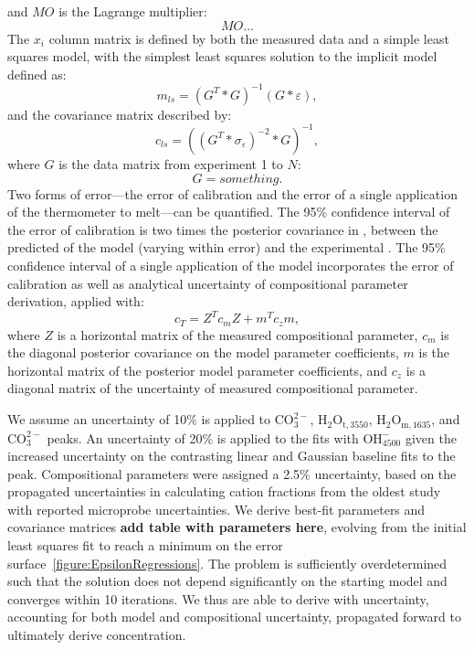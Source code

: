 \documentclass[draft]{agujournal2019}
\begin{document}
and $MO$ is the Lagrange multiplier: 
\begin{equation}
    MO...
\end{equation}
The $x_i$ column matrix is defined by both the measured data and a simple least squares model, with the simplest least squares solution to the implicit model defined as: 
\begin{equation}
    m_{ls} = (G^T*G)^{-1} (G*\varepsilon), 
\end{equation} and the covariance matrix described by: 
\begin{equation}
    c_{ls} = ((G^T*\sigma_{\varepsilon})^{-2} * G)^{-1}, 
\end{equation}
where $G$ is the data matrix from experiment 1 to $N$: 
\begin{equation}
    G = something. 
\end{equation}
Two forms of error—the error of calibration and the error of a single application of the thermometer to melt—can be quantified. The 95\% confidence interval of the error of calibration is two times the posterior covariance in \textepsilon, between the predicted \textepsilon of the model (varying within error) and the experimental \textepsilon. The 95\% confidence interval of a single application of the model incorporates the error of calibration as well as analytical uncertainty of compositional parameter derivation, applied with: 
\begin{equation}
    c_T = Z^T c_m Z + m^T c_z m, 
\end{equation}
where $Z$ is a horizontal matrix of the measured compositional parameter, $c_m$ is the diagonal posterior covariance on the model parameter coefficients, $m$ is the horizontal matrix of the posterior model parameter coefficients, and $c_z$ is a diagonal matrix of the uncertainty of measured compositional parameter. 

We assume an uncertainty of 10\% is applied to \textepsilon${\mathrm{CO_3^{2-}}}$, \textepsilon${\mathrm{H_2O_{t, 3550}}}$, \textepsilon${\mathrm{H_2O_{m, 1635}}}$, and \textepsilon${\mathrm{CO_3^{2-}}}$ peaks. An uncertainty of 20\% is applied to the fits with \textepsilon${\mathrm{OH^{-}_{4500}}}$ given the increased uncertainty on the contrasting linear and Gaussian baseline fits to the peak. Compositional parameters were assigned a 2.5\% uncertainty, based on the propagated uncertainties in calculating cation fractions from the oldest study with reported microprobe uncertainties. We derive best-fit parameters and covariance matrices \textbf{add table with parameters here}, evolving from the initial least squares fit to reach a minimum on the error surface~\ref{figure:EpsilonRegressions}. The problem is sufficiently overdetermined such that the solution does not depend significantly on the starting model and converges within 10 iterations. We thus are able to derive \textepsilon with uncertainty, accounting for both model and compositional uncertainty, propagated forward to ultimately derive concentration. 
\end{document}
